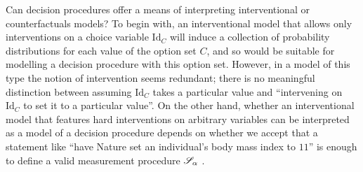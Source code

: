 Can decision procedures offer a means of interpreting interventional or counterfactuals models? To begin with, an interventional model that allows only interventions on a choice variable $\mathrm{Id}_C$ will induce a collection of probability distributions for each value of the option set $C$, and so would be suitable for modelling a decision procedure with this option set. However, in a model of this type the notion of intervention seems redundant; there is no meaningful distinction between assuming $\mathrm{Id}_C$ takes a particular value and ``intervening on $\mathrm{Id}_C$ to set it to a particular value''. On the other hand, whether an interventional model that features hard interventions on arbitrary variables can be interpreted as a model of a decision procedure depends on whether we accept that a statement like ``have Nature set an individual's body mass index to $11$'' is enough to define a valid measurement procedure $\mathscr{S}_\alpha$ \citep{pearl_does_2018}.